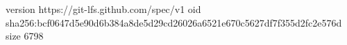 version https://git-lfs.github.com/spec/v1
oid sha256:bcf0647d5e90d6b384a8de5d29cd26026a6521e670c5627df7f355d2fc2e576d
size 6798
